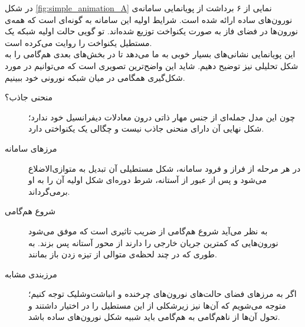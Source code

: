 \newpage
{}
در شکل 
\ref{fig:simple_animation_A}
نمایی از ۶ برداشت از پویانمایی سامانه‌ی نورون‌های ساده ارائه شده است. شرایط اولیه این سامانه به گونه‌ای است که همه‌ی نورون‌ها در فضای فاز به صورت یکنواخت توزیع شده‌اند. تو گویی حالت اولیه شبکه یک مستطیل یکنواخت را روایت می‌کرده است.\\
این پویانمایی نشانی‌های بسیار خوبی به ما می‌دهد تا در بخش‌های بعدی هم‌گامی را به شکل تحلیلی نیز توضیح دهیم. شاید این واضح‌ترین تصویری است که می‌توانیم در مورد شکل‌گیری همگامی در میان شبکه نورونی خود ببینیم.
\begin{description}
	\item[منحنی جاذب؟]
	چون این مدل جمله‌ای از جنس مهار ذاتی درون معادلات دیفرانسیل خود ندارد؛ شکل نهایی آن دارای منحنی جاذب نیست و چگالی یک یکنواختی دارد.
	\item[مرزهای سامانه]
	در هر مرحله از فراز و فرود سامانه، شکل مستطیلی آن تبدیل به متوازی‌الاضلاع می‌شود و پس از عبور از آستانه، شرط دوره‌ای شکل اولیه آن را به او برمی‌گرداند.
	\item[شروع هم‌گامی]
	به نظر می‌آید شروع هم‌گامی از ضریب تاثیری است که موفق می‌شود نورون‌هایی که کمترین جریان خارجی را دارند از محور آستانه پس بزند. به طوری که در چند لحظه‌ی متوالی از تیزه زدن باز بمانند.
	\item[مرزبندی مشابه]
	اگر به مرزهای فضای حالت‌های نورون‌های چرخنده و انباشت‌وشلیک توجه کنیم؛ متوجه می‌شویم که آن‌ها نیز زیرشکلی از این مستطیل را در اختیار داشتند و تحول آن‌ها از ناهم‌گامی به هم‌گامی باید شبیه شکل نورون‌های ساده باشد. 
\end{description}

